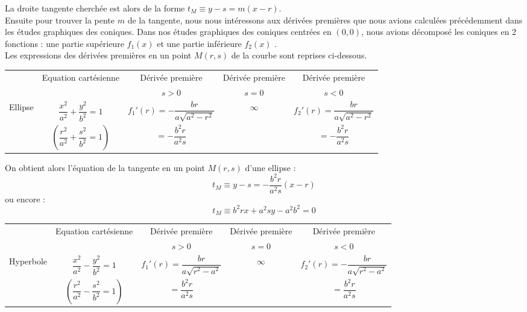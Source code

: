 La droite tangente cherchée est alors de la forme $t_M \equiv y-s=m(x-r)$.\\

Ensuite pour trouver la pente $m$ de la tangente, nous nous intéressons aux dérivées premières que 
nous avions calculées précédemment dans les études graphiques des coniques.
Dans nos études graphiques des coniques centrées en $(0,0)$, 
nous avions décomposé les coniques en 2 fonctions : une partie supérieure $f_1(x)$ et une partie inférieure $f_2(x)$ .\\
Les expressions des dérivées premières en un point $M(r,s)$ de la courbe sont reprises ci-dessous.

\begin{center}
\renewcommand{\arraystretch}{2} %
\begin{tabular}{c|c|c|c|c}
\hline
 & Equation cartésienne & Dérivée première& Dérivée première& Dérivée première\\
 &  & \textbf{$s>0$} & \textbf{$s=0$} & \textbf{$s<0$} \\
\hline
Ellipse & $ \dfrac{x^2}{a^2} + \dfrac{y^2}{b^2} = 1 $ & $f_1'(r) = -\dfrac{b r}{a \sqrt{a^2-r^2}}$ & 
$\infty$ & $f_2'(r) = \dfrac{b r}{a \sqrt{a^2-r^2}}$ \\
 & $\left(\dfrac{r^2}{a^2} + \dfrac{s^2}{b^2} = 1 \right)$ & $ = -\dfrac{b^2 r}{a^2 s}$ & & $ = -\dfrac{b^2 r}{a^2 s}$ \\
\hline
\end{tabular}
\end{center}

On obtient alors l'équation de la tangente en un point $M(r,s)$ d'une ellipse :
\[t_M \equiv y-s = -\dfrac{b^2 r}{a^2 s} (x-r)\]
ou encore :
\[t_M \equiv b^2rx + a^2sy - a^2b^2=0
\]


\newpage
{}
\begin{center}
\renewcommand{\arraystretch}{2} %
\begin{tabular}{c|c|c|c|c}
\hline
 & Equation cartésienne & Dérivée première& Dérivée première& Dérivée première\\
 &  & \textbf{$s>0$} & \textbf{$s=0$} & \textbf{$s<0$} \\
\hline
Hyperbole & $\dfrac{x^2}{a^2} - \dfrac{y^2}{b^2} = 1$ & $f_1'(r) = \dfrac{b r}{a \sqrt{r^2 - a^2}}$ & $\infty$ & $f_2'(r) = -\dfrac{b r}{a \sqrt{r^2 - a^2}}$ \\
 &  $\left(\dfrac{r^2}{a^2} - \dfrac{s^2}{b^2} = 1\right)$ & $= \dfrac{b^2 r}{a^2 s}$ & & $ = \dfrac{b^2 r}{a^2 s}$ \\
\hline
\end{tabular}
\end{center}

